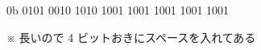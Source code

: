 \begin{center}
0b 0101 0010 1010 1001 1001 1001 1001 1001

\noindent ※ 長いので 4 ビットおきにスペースを入れてある
\end{center}
